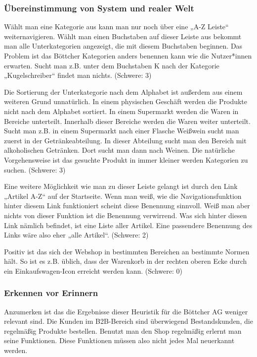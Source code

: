 \documentclass[utf8,biblatex]{lni}
\begin{document}
\subsubsection*{Übereinstimmung von System und realer Welt}
Wählt man eine Kategorie aus kann man nur noch über eine „A-Z Leiste“ weiternavigieren. Wählt man einen Buchstaben auf dieser Leiste aus bekommt man alle Unterkategorien angezeigt, die mit diesem Buchstaben beginnen. Das Problem ist das Böttcher Kategorien anders benennen kann wie die Nutzer*innen erwarten. Sucht man z.B. unter dem Buchstaben K nach der Kategorie „Kugelschreiber“ findet man nichts. (Schwere: 3)

Die Sortierung der Unterkategorie nach dem Alphabet ist außerdem aus einem weiteren Grund unnatürlich. In einem physischen Geschäft werden die Produkte nicht nach dem Alphabet sortiert. In einem Supermarkt werden die Waren in Bereiche unterteilt. Innerhalb dieser Bereiche werden die Waren weiter unterteilt. Sucht man z.B. in einem Supermarkt nach einer Flasche Weißwein sucht man zuerst in der Getränkeabteilung. In dieser Abteilung sucht man den Bereich mit alkoholischen Getränken. Dort sucht man dann nach Weinen. Die natürliche Vorgehensweise ist das gesuchte Produkt in immer kleiner werden Kategorien zu suchen. (Schwere: 3)

Eine weitere Möglichkeit wie man zu dieser Leiste gelangt ist durch den Link „Artikel A-Z“ auf der Startseite. Wenn man weiß, wie die Navigationsfunktion hinter diesem Link funktioniert scheint diese Benennung sinnvoll. Weiß man aber nichts von dieser Funktion ist die Benennung verwirrend. Was sich hinter diesen Link nämlich befindet, ist eine Liste aller Artikel. Eine passendere Benennung des Links wäre also eher „alle Artikel“. (Schwere: 2)

Positiv ist das sich der Webshop in bestimmten Bereichen an bestimmte Normen hält. So ist es z.B. üblich, dass der Warenkorb in der rechten oberen Ecke durch ein Einkaufswagen-Icon erreicht werden kann. (Schwere: 0)


\subsubsection*{Erkennen vor Erinnern}
Anzumerken ist das die Ergebnisse dieser Heuristik für die Böttcher AG weniger relevant sind. Die Kunden im B2B-Bereich sind überwiegend Bestandskunden, die regelmäßig Produkte bestellen. Benutzt man den Shop regelmäßig erlernt man seine Funktionen. Diese Funktionen müssen also nicht jedes Mal neuerkannt werden.
\end{document}
